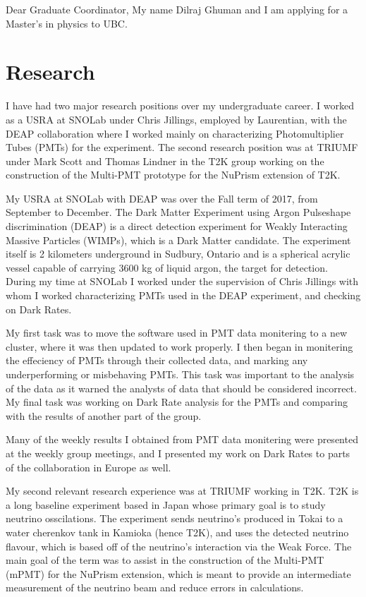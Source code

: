 \documentclass[12pt]{article}
\begin{document}
Dear Graduate Coordinator,
My name Dilraj Ghuman and I am applying for a Master's in physics to UBC. 
\section{Research}
I have had two major research positions over my undergraduate career. I worked as a USRA at SNOLab under Chris Jillings, employed by Laurentian, with the DEAP collaboration where I worked mainly on characterizing Photomultiplier Tubes (PMTs) for the experiment. The second research position was at TRIUMF under Mark Scott and Thomas Lindner in the T2K group working on the construction of the Multi-PMT prototype for the NuPrism extension of T2K.

My USRA at SNOLab with DEAP was over the Fall term of 2017, from September to December. The Dark Matter Experiment using Argon Pulseshape discrimination (DEAP) is a direct detection experiment for Weakly Interacting Massive Particles (WIMPs), which is a Dark Matter candidate. The experiment itself is 2 kilometers underground in Sudbury, Ontario and is a spherical acrylic vessel capable of carrying 3600 kg of liquid argon, the target for detection. During my time at SNOLab I worked under the supervision of Chris Jillings with whom I worked characterizing PMTs used in the DEAP experiment, and checking on Dark Rates.

My first task was to move the software used in PMT data monitering to a new cluster, where it was then updated to work properly. I then began in monitering the effeciency of PMTs through their collected data, and marking any underperforming or misbehaving PMTs. This task was important to the analysis of the data as it warned the analysts of data that should be considered incorrect. My final task was working on Dark Rate analysis for the PMTs and comparing with the results of another part of the group.

Many of the weekly results I obtained from PMT data monitering were presented at the weekly group meetings, and I presented my work on Dark Rates to parts of the collaboration in Europe as well.

My second relevant research experience was at TRIUMF working in T2K. T2K is a long baseline experiment based in Japan whose primary goal is to study neutrino osscilations. The experiment sends neutrino's produced in Tokai to a water cherenkov tank in Kamioka (hence T2K), and uses the detected neutrino flavour, which is based off of the neutrino's interaction via the Weak Force. The main goal of the term was to assist in the construction of the Multi-PMT (mPMT) for the NuPrism extension, which is meant to provide an intermediate measurement of the neutrino beam and reduce errors in calculations.
\end{document}
